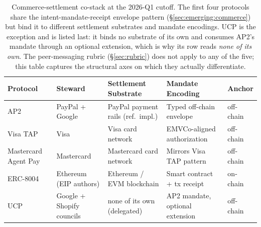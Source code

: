 
\begin{table}[h!]
  \centering
  \caption{Commerce-settlement co-stack at the 2026-Q1 cutoff. The first four
  protocols share the intent-mandate-receipt envelope pattern
  (\S\ref{sec:emerging:commerce}) but bind it to different settlement
  substrates and mandate encodings. UCP is the exception and is listed last:
  it binds no substrate of its own and consumes AP2's mandate through an
  optional extension, which is why its row reads \emph{none of its own}. The
  peer-messaging rubric (\S\ref{sec:rubric}) does not apply to any of the
  five; this table captures the structural axes on which they actually
  differentiate.}
  \label{tab:commerce-stack}
  \footnotesize
  \begin{tabular}{lllll}
    \toprule
    Protocol & Steward & Settlement Substrate & Mandate Encoding & Anchor \\
    \midrule
    AP2                  & PayPal + Google           & PayPal payment rails (ref.\ impl.) & Typed off-chain envelope          & off-chain \\
    Visa TAP             & Visa                      & Visa card network                  & EMVCo-aligned authorization       & off-chain \\
    Mastercard Agent Pay & Mastercard                & Mastercard card network            & Mirrors Visa TAP pattern          & off-chain \\
    ERC-8004             & Ethereum (EIP authors)    & Ethereum / EVM blockchain          & Smart contract + tx receipt       & on-chain  \\
    UCP                  & Google + Shopify councils & none of its own (delegated)        & AP2 mandate, optional extension   & off-chain \\
    \bottomrule
  \end{tabular}
\end{table}
